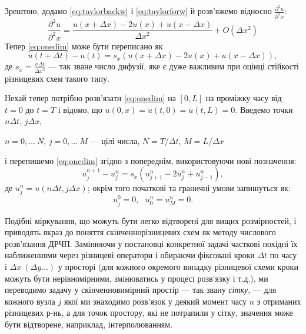 Зрештою, додамо \eqref{eq:taylorbackw} і \eqref{eq:taylorforw} й розв’яжемо відносно $\frac{\partial^2 u}{\partial^2 x}$:
\begin{equation}
\frac{\partial^2 u}{\partial^2 x} = \frac{u(x+\Delta x) - 2u(x) + u(x-\Delta x)}{\Delta x^2} + O\left(\Delta x^2\right)
\end{equation}
Тепер \eqref{eq:onedim} може бути переписано як
\begin{equation}
u(t + \Delta t) - u(t) = s_x\left(u(x+\Delta x) - 2u(x) + u(x-\Delta x)\right),
\end{equation}
де $s_x = \frac{\sigma\Delta t}{\Delta x^2}$ --- так зване число дифузії, яке є дуже важливим при оцінці стійкості різницевих схем такого типу.

Нехай тепер потрібно розв’язати \eqref{eq:onedim} на $\left[0,L\right]$ на проміжку часу від $t=0$ до $t=T$ і відомо, що $u(0,x)=u(t,0)=u(t,L) = 0$.
Введемо точки $n\Delta t$, $j\Delta x$, \\
\begin{center}
\vspace{-0.05\linewidth}
$n = 0, \dots\ N$, $j = 0, \dots\ M$ --- цілі числа, $N = T/\Delta t$, $M = L/\Delta x$
\end{center}
і перепишемо \eqref{eq:onedim} згідно з попереднім, використовуючи нові позначення:
\begin{equation}
u^{n+1}_j - u^n_j = s_x\left(u^n_{j+1} -2u^n_j + u^n_{j-1}\right),
\end{equation}
де $u^n_j = u(n\Delta t, j\Delta x)$;
окрім того початкові та граничні умови запишуться як:
\begin{equation}
u^{0}_j = 0, \text{\ }
u^n_0 = u^n_M = 0.
\end{equation}

Подібні міркування, що можуть бути легко відтворені для вищих розмірностей, і приводять якраз до поняття скінченнорізницевих схем як методу числового розв’язання ДРЧП. Замінюючи у постановці конкретної задачі часткові похідні їх наближеннями через
різницеві оператори і обираючи фіксовані кроки $\Delta t$ по часу і $\Delta x \ (\Delta y \dots)$ у просторі (для кожного окремого випадку різницевої схеми кроки можуть бути нерівномірними, змінюватись у процесі розв’язку і т.д.), ми переводимо задачу у скінченновимірний простір --- так звану \textit{сітку}, --- для кожного вузла $j$ якої ми знаходимо розв’язок у деякий момент часу $n$ з отриманих різницевих р-нь, а для точок простору, які не потрапили у сітку, значення може бути відтворене, наприклад, інтерполюванням.

